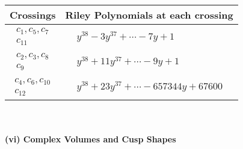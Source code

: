 \documentclass[1p]{elsarticle_modified}
\theoremstyle{definition}
\begin{document}
\begin{tabular}{m{50pt}|m{274pt}}
Crossings & \hspace{64pt}Riley Polynomials at each crossing \\
\hline $$\begin{aligned}c_{1},c_{5},c_{7}\\c_{11}\end{aligned}$$&$\begin{aligned}
&y^{38}-3 y^{37}+\cdots-7 y+1
\end{aligned}$\\
\hline $$\begin{aligned}c_{2},c_{3},c_{8}\\c_{9}\end{aligned}$$&$\begin{aligned}
&y^{38}+11 y^{37}+\cdots-9 y+1
\end{aligned}$\\
\hline $$\begin{aligned}c_{4},c_{6},c_{10}\\c_{12}\end{aligned}$$&$\begin{aligned}
&y^{38}+23 y^{37}+\cdots-657344 y+67600
\end{aligned}$\\
\hline
\end{tabular}\\~\\
\newpage\flushleft \textbf{(vi) Complex Volumes and Cusp Shapes}
\end{document}
